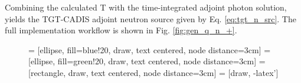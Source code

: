 Combining the calculated T with the time-integrated adjoint photon solution,
yields the TGT-CADIS adjoint neutron source given by Eq.
\ref{eq:tgt_n_src}.  The full implementation workflow is shown in Fig.
\ref{fig:gen_q_n_+}.



\begin{figure}
\centering

         = [ellipse, fill=blue!20, draw, text centered, node distance=3cm]
         = [ellipse, fill=green!20, draw, text centered, node distance=3cm]
         = [rectangle, draw, text centered, node distance=3cm]
         = [draw, -latex']
        

\end{figure}
